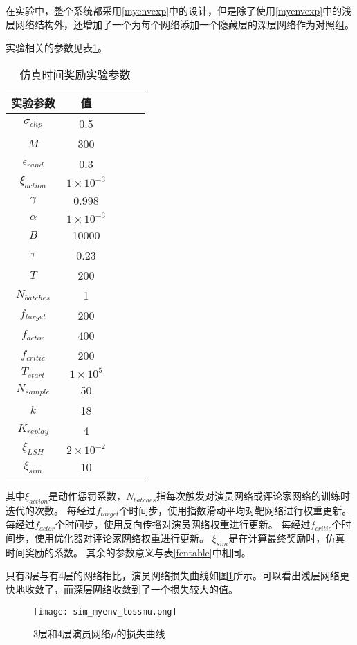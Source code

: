 在实验中，整个系统都采用\ref{myenvexp}中的设计，但是除了使用\ref{myenvexp}中的浅层网络结构外，还增加了一个为每个网络添加一个隐藏层的深层网络作为对照组。

实验相关的参数见表\ref{simtable}。
    \begin{table}[htbp]
        \caption{仿真时间奖励实验参数}
        \label{simtable}
    \vspace{0.5em}\centering\wuhao
    \begin{tabular}{ccccc}
    \toprule[1.5pt]
    实验参数 & 值\\
    \midrule[1pt]
        $\sigma_{clip}$ & 0.5\\
        $M$ & 300\\
        $\epsilon_{rand}$ & 0.3\\
        $\xi_{action}$ & $1\times 10^{-3}$\\
        $\gamma$ & 0.998\\
        $\alpha$ & $1\times 10^{-3}$\\
        $B$ & 10000\\
        $\tau$ & 0.23\\
        $T$ & 200\\
        $N_{batches}$ & 1\\
        $f_{target}$ & 200\\
        $f_{actor}$ & 400\\
        $f_{critic}$ & 200\\
        $T_{start}$ & $1\times 10^5$\\
        $N_{sample}$ & 50 \\
        $k$ & 18\\
        $K_{replay}$ & 4\\
        $\xi_{LSH}$ & $2\times 10^{-2}$\\
        $\xi_{sim}$ & 10\\
    \bottomrule[1.5pt]
    \end{tabular}
    \end{table}
    其中$\xi_{action}$是动作惩罚系数，$N_{batches}$指每次触发对演员网络或评论家网络的训练时迭代的次数。
    每经过$f_{target}$个时间步，使用指数滑动平均对靶网络进行权重更新。
    每经过$f_{actor}$个时间步，使用反向传播对演员网络权重进行更新。
    每经过$f_{critic}$个时间步，使用优化器对评论家网络权重进行更新。
    $\xi_{sim}$是在计算最终奖励时，仿真时间奖励的系数。
    其余的参数意义与表\ref{fcntable}中相同。

只有3层与有4层的网络相比，演员网络损失曲线如图\ref{simlossmu}所示。可以看出浅层网络更快地收敛了，而深层网络收敛到了一个损失较大的值。
        \begin{figure}[htpb]
        \centering
        \texttt{[image: sim\_myenv\_lossmu.png]}
        \caption{3层和4层演员网络$\mu$的损失曲线}
            \label{simlossmu}
        \end{figure}

